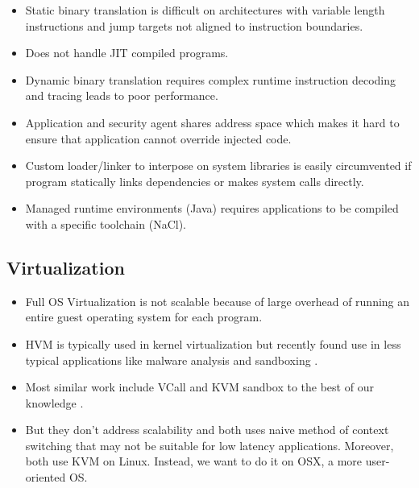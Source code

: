 \documentclass{article}
\begin{document}
\begin{itemize}
    \item
        Static binary translation is difficult on architectures with variable length instructions and jump targets not aligned to instruction boundaries.
    \item
        Does not handle JIT compiled programs.
    \item
        Dynamic binary translation requires complex runtime instruction decoding and tracing leads to poor performance.
    \item
        Application and security agent shares address space which makes it hard to ensure that application cannot override injected code.
    \item
        Custom loader/linker to interpose on system libraries is easily circumvented if program statically links dependencies or makes system calls directly.
    \item
        Managed runtime environments (Java) requires applications to be compiled with a specific toolchain (NaCl).
\end{itemize}

\subsection{Virtualization}
\begin{itemize}
    \item
        Full OS Virtualization is not scalable because of large overhead of running an entire guest operating system for each program.
    \item
        HVM is typically used in kernel virtualization but recently found use in less typical applications like malware analysis \cite{Ether2008} and sandboxing \cite{Ayer2012, VCall2010}.
    \item
        Most similar work include VCall and KVM sandbox to the best of our knowledge \cite{Ayer2012, VCall2010}.
    \item
        But they don't address scalability and both uses naive method of context switching that may not be suitable for low latency applications. Moreover, both use KVM on Linux. Instead, we want to do it on OSX, a more user-oriented OS.
\end{itemize}
\end{document}
